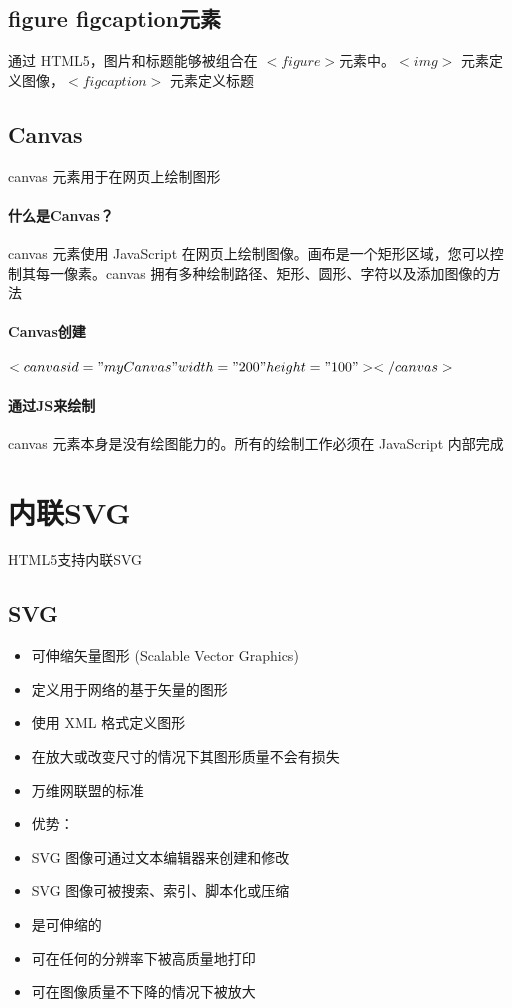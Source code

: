 \documentclass[10pt,UTF8]{ctexart}
\begin{document}
\subsection{figure figcaption元素}
通过 HTML5，图片和标题能够被组合在 $<figure>$元素中。$<img>$ 元素定义图像，$<figcaption>$ 元素定义标题
\subsection{Canvas}
canvas 元素用于在网页上绘制图形
\paragraph{什么是Canvas？} canvas 元素使用 JavaScript 在网页上绘制图像。画布是一个矩形区域，您可以控制其每一像素。canvas 拥有多种绘制路径、矩形、圆形、字符以及添加图像的方法
\paragraph{Canvas创建}
$<canvas id="myCanvas" width="200" height="100"></canvas>$
\paragraph{通过JS来绘制}canvas 元素本身是没有绘图能力的。所有的绘制工作必须在 JavaScript 内部完成
\section{内联SVG}
HTML5支持内联SVG
\subsection{SVG}
\begin{itemize}
\item 可伸缩矢量图形 (Scalable Vector Graphics)
\item 定义用于网络的基于矢量的图形
\item 使用 XML 格式定义图形
\item 在放大或改变尺寸的情况下其图形质量不会有损失
\item 万维网联盟的标准
\item 优势：
\item SVG 图像可通过文本编辑器来创建和修改
\item SVG 图像可被搜索、索引、脚本化或压缩
\item 是可伸缩的
\item 可在任何的分辨率下被高质量地打印
\item 可在图像质量不下降的情况下被放大
\end{itemize}
\end{document}
